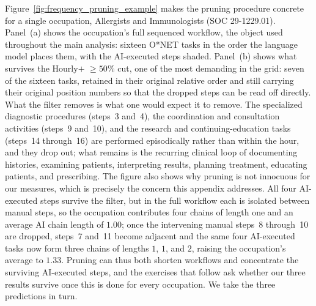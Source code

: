 Figure~\ref{fig:frequency_pruning_example} makes the pruning procedure concrete for a single occupation, Allergists and Immunologists (SOC 29-1229.01).
Panel~(a) shows the occupation's full sequenced workflow, the object used throughout the main analysis: sixteen O*NET tasks in the order the language model places them, with the AI-executed steps shaded.
Panel~(b) shows what survives the Hourly$+$ $\geq 50\%$ cut, one of the most demanding in the grid: seven of the sixteen tasks, retained in their original relative order and still carrying their original position numbers so that the dropped steps can be read off directly.
What the filter removes is what one would expect it to remove.
The specialized diagnostic procedures (steps~3 and~4), the coordination and consultation activities (steps~9 and~10), and the research and continuing-education tasks (steps~14 through~16) are performed episodically rather than within the hour, and they drop out; what remains is the recurring clinical loop of documenting histories, examining patients, interpreting results, planning treatment, educating patients, and prescribing.
The figure also shows why pruning is not innocuous for our measures, which is precisely the concern this appendix addresses.
All four AI-executed steps survive the filter, but in the full workflow each is isolated between manual steps, so the occupation contributes four chains of length one and an average AI chain length of $1.00$; once the intervening manual steps~8 through~10 are dropped, steps~7 and~11 become adjacent and the same four AI-executed tasks now form three chains of lengths $1$, $1$, and $2$, raising the occupation's average to $1.33$.
Pruning can thus both shorten workflows and concentrate the surviving AI-executed steps, and the exercises that follow ask whether our three results survive once this is done for every occupation.
We take the three predictions in turn.

